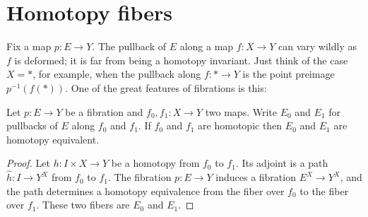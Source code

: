 \section{Homotopy fibers}

Fix a map $p:E\to Y$. The pullback of $E$ along a map $f:X\to Y$ can vary
wildly as $f$ is deformed; it is far from being a homotopy invariant. 
Just think of the case $X=*$, for example, when the pullback along 
$f:*\to Y$ is the point preimage $p^{-1}(f(*))$. One of the great
features of fibrations is this:

\begin{prop}
Let $p:E\to Y$ be a fibration and $f_0,f_1:X\to Y$ two maps.  
Write $E_0$ and $E_1$ for pullbacks of $E$ along $f_0$ and $f_1$.
If $f_0$ and $f_1$ are homotopic then $E_0$ and $E_1$ are homotopy
equivalent.
\end{prop}
\begin{proof}
Let $h:I\times X\to Y$ be a homotopy from $f_0$ to $f_1$. Its adjoint
is a path $\widehat h:I\to Y^X$ from $f_0$ to $f_1$. The fibration $p:E\to Y$
induces a fibration $E^X\to Y^X$, and the path determines a homotopy 
equivalence from the fiber over $f_0$ to the fiber over $f_1$. 
These two fibers are $E_0$ and $E_1$. 
\end{proof}

